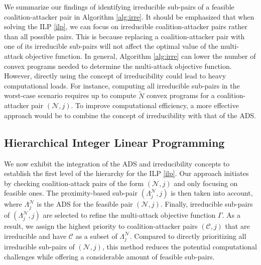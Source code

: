 \documentclass[journal]{IEEEtran}
\newcommand{\N}{\mathcal{N}}
\newcommand{\C}{\mathcal{C}}
\newcommand{\1}{\mathbf{1}}
\begin{document}
We summarize our findings of identifying irreducible sub-pairs of a feasible coalition-attacker pair in Algorithm \ref{alg:irre}. It should be emphasized that when solving the ILP \eqref{ilp}, we can focus on irreducible coalition-attacker pairs rather than all possible pairs. This is because replacing a coalition-attacker pair with one of its irreducible sub-pairs will not affect the optimal value of the multi-attack objective function. In general, Algorithm \ref{alg:irre} can lower the number of convex programs needed to determine the multi-attack objective function. However, directly using the concept of irreducibility could lead to heavy computational loads. For instance, computing all irreducible sub-pairs in the worst-case scenario requires up to compute $\tilde{N}$ convex programs for a coalition-attacker pair $(\N,j)$. To improve computational efficiency, a more effective approach would be to combine the concept of irreducibility with that of the ADS.

\subsection{Hierarchical Integer Linear Programming}\label{sec:4.3}

We now exhibit the integration of the ADS and irreducibility concepts to establish the first level of the hierarchy for the ILP \eqref{ilp}. Our approach initiates by checking coalition-attack pairs of the form $(\N,j)$ and only focusing on feasible ones. The proximity-based sub-pair $(\Lambda^{\N}_j,j)$ is then taken into account, where $\Lambda^{\N}_j$ is the ADS for the feasible pair $(\N,j)$. Finally, irreducible sub-pairs of $(\Lambda^{\N}_j,j)$ are selected to refine the multi-attack objective function $\Gamma$. As a result, we assign the highest priority to coalition-attacker pairs $(\C,j)$ that are irreducible and have $\C$ as a subset of $\Lambda^{\N}_j$. Compared to directly prioritizing all irreducible sub-pairs of $(\N,j)$, this method reduces the potential computational challenges while offering a considerable amount of feasible sub-pairs.
\end{document}
